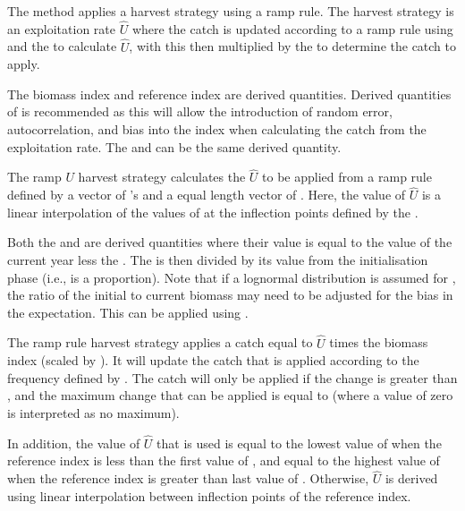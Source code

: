 The  method applies a harvest strategy using a ramp rule. The harvest strategy is an exploitation rate $\hat{U}$ where the catch is updated according to a ramp rule using  and the  to calculate $\hat{U}$, with this then multiplied by the  to determine the catch to apply.

The biomass index and reference index are derived quantities. Derived quantities of  is recommended as this will allow the introduction of random error, autocorrelation, and bias into the index when calculating the catch from the exploitation rate. The  and  can be the same derived quantity.

The ramp $U$ harvest strategy calculates the $\hat{U}$ to be applied from a ramp rule defined by a vector of 's and a equal length vector of . Here, the value of $\hat{U}$ is a linear interpolation of the values of  at the inflection points defined by the . 

Both the  and  are derived quantities where their value is equal to the value of the current year less the . The  is then divided by its value from the initialisation phase (i.e., is a proportion). Note that if a lognormal distribution is assumed for , the ratio of the initial to current biomass may need to be adjusted for the bias in the expectation. This can be applied using . 

The ramp rule harvest strategy applies a catch equal to $\hat{U}$ times the biomass index (scaled by ). It will update the catch that is applied according to the frequency defined by . The catch will only be applied if the change is greater than , and the maximum change that can be applied is equal to  (where a value of zero is interpreted as no maximum). 

In addition, the value of $\hat{U}$ that is used is equal to the lowest value of  when the reference index is less than the first value of , and equal to the highest value of  when the reference index is greater than last value of . Otherwise, $\hat{U}$ is derived using linear interpolation between inflection points of the reference index.

